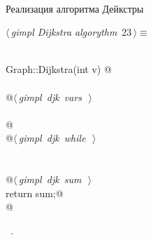 \documentclass[12pt]{article}
\begin{document}
\paragraph{}
Реализация алгоритма Дейкстры \cite{Dijkstra}
\begin{flushleft} \small
\begin{minipage}{\linewidth}\label{scrap37}\raggedright\small
{} $\langle\,${\itshape gimpl Dijkstra algorythm}\nobreak\ {\footnotesize {23}}$\,\rangle\equiv$
\vspace{-1ex}
\begin{list}{}{} \item
\mbox{}\verb@@\\
\mbox{}\verb@double Graph::Dijkstra(int v) {@\\
\mbox{}\verb@@\\
\mbox{}\verb@    @\hbox{$\langle\,${\itshape gimpl djk vars}\nobreak\ {\footnotesize {}}$\,\rangle$}\verb@@\\
\mbox{}\verb@@\\
\mbox{}\verb@    @\\
\mbox{}\verb@    @\hbox{$\langle\,${\itshape gimpl djk while}\nobreak\ {\footnotesize {}}$\,\rangle$}\verb@@\\
\mbox{}\verb@@\\
\mbox{}\verb@@\\
\mbox{}\verb@    @\hbox{$\langle\,${\itshape gimpl djk sum}\nobreak\ {\footnotesize {}}$\,\rangle$}\verb@@\\
\mbox{}\verb@    return sum;@\\
\mbox{}\verb@}@\\
\mbox{}\verb@@{\NWsep}
\end{list}
\vspace{-1.5ex}
\footnotesize
\begin{list}{}{\setlength{\itemsep}{-\parsep}\setlength{\itemindent}{-\leftmargin}}
\item \NWtxtMacroRefIn\ .

\item{}
\end{list}
\end{minipage}\vspace{4ex}
\end{flushleft}
\end{document}
